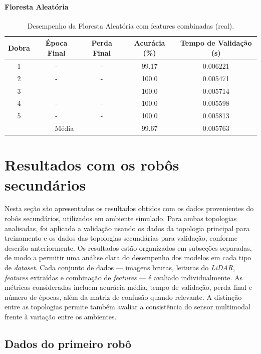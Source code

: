 \paragraph{Floresta Aleatória}

\begin{table}[H]
\caption{Desempenho da Floresta Aleatória com features combinadas (real).}
\centering
\begin{tabular}{ccccc}
\hline
\textbf{Dobra} & \textbf{Época Final} & \textbf{Perda Final} & \textbf{Acurácia (\%)} & \textbf{Tempo de Validação (s)}  \\
\hline
1 & - & - & 99.17 & 0.006221 \\
2 & - & - & 100.0 & 0.005471 \\
3 & - & - & 100.0 & 0.005714 \\
4 & - & - & 100.0 & 0.005598 \\
5 & - & - & 100.0 & 0.005813 \\
\hline
\multicolumn{3}{c}{Média} & 99.67 & 0.005763 \\
\hline
\end{tabular}
\fonte{}
\label{tab:resultados_rf_lidar_real}
\end{table}



\section{Resultados com os robôs secundários}

Nesta seção são apresentados os resultados obtidos com os dados provenientes do robôs secundários, utilizados em ambiente simulado. Para ambas topologias analisadas, foi aplicada a validação usando os dados da topologia principal para treinamento e os dados das topologias secundárias para validação, conforme descrito anteriormente. Os resultados estão organizados em subseções separadas, de modo a permitir uma análise clara do desempenho dos modelos em cada tipo de \textit{dataset}. Cada conjunto de dados — imagens brutas, leituras do \textit{LiDAR}, \textit{features} extraídas e combinação de \textit{features} — é avaliado individualmente. As métricas consideradas incluem acurácia média, tempo de validação, perda final e número de épocas, além da matriz de confusão quando relevante. A distinção entre as topologias permite também avaliar a consistência do sensor multimodal frente à variação entre os ambientes.

\subsection{Dados do primeiro robô}

